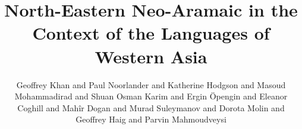 \author{Geoffrey Khan and Paul Noorlander and Katherine Hodgson and Masoud Mohammadirad and Shuan Osman Karim and Ergin \"Opengin and Eleanor Coghill and Mahîr Dogan and Murad Suleymanov and Dorota Molin and Geoffrey Haig and Parvin Mahmoudveysi} %
\title{North-Eastern Neo-Aramaic in the Context of the Languages of Western Asia}
 \lsCoverTitleSizes{48pt}{16pt}
\renewcommand{\lsSeries}{cam}
\renewcommand{\lsSeriesNumber}{} 
